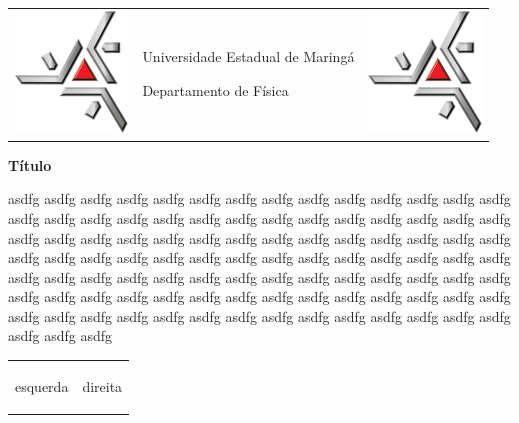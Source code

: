 \documentclass[12pt, a4paper]{report}
\begin{document}

\begin{center}
	\begin{tabular}{m{3.0cm}m{8cm}m{3.0cm}}
		\includegraphics[width=3.0cm]{uem} &
		Universidade Estadual de Maringá   
	
		Departamento de Física             &
		\includegraphics[width=3.0cm]{uem} \\
	\end{tabular}
\end{center}
\vspace{2cm}

\begin{center}
	{\large {\bf Título}}
\end{center}

\vspace{5cm}

asdfg asdfg asdfg asdfg asdfg asdfg asdfg asdfg asdfg asdfg asdfg asdfg asdfg asdfg asdfg asdfg asdfg asdfg asdfg asdfg asdfg asdfg asdfg asdfg asdfg asdfg asdfg asdfg asdfg asdfg asdfg asdfg asdfg asdfg asdfg asdfg asdfg asdfg asdfg asdfg asdfg asdfg asdfg asdfg asdfg asdfg asdfg asdfg asdfg asdfg asdfg asdfg asdfg asdfg asdfg asdfg asdfg asdfg asdfg asdfg asdfg asdfg asdfg asdfg asdfg asdfg asdfg asdfg asdfg asdfg asdfg asdfg asdfg asdfg asdfg asdfg asdfg asdfg asdfg asdfg asdfg asdfg asdfg asdfg asdfg asdfg asdfg asdfg asdfg asdfg asdfg asdfg asdfg asdfg asdfg asdfg asdfg asdfg asdfg asdfg asdfg 

\vfill 

\begin{center}
	\begin{tabular}{m{7cm}m{7cm}}
		\begin{flushleft}
		esquerda
		\end{flushleft}
		&
		\begin{flushright}
		direita
		\end{flushright}
	\end{tabular}
\end{center}
\end{document}
